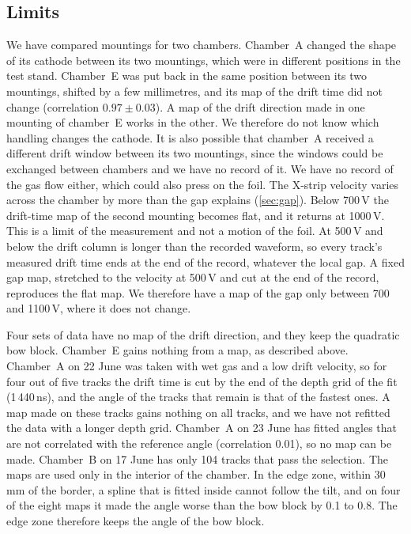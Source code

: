 \subsection{Limits}
We have compared mountings for two chambers. Chamber~A changed the shape of its cathode between its two
mountings, which were in different positions in the test stand. Chamber~E was put back in the same position between
its two mountings, shifted by a few millimetres, and its map of the drift time did not change (correlation
$0.97\pm0.03$). A map of the drift direction made in one mounting of chamber~E works in the other. We therefore do
not know which handling changes the cathode. It is also possible that chamber~A received a different drift window
between its two mountings, since the windows could be exchanged between chambers and we have no record of it. We have
no record of the gas flow either, which could also press on the foil. The X-strip velocity varies across the chamber by
more than the gap explains (\cref{sec:gap}). Below 700\,V the drift-time map of the second mounting becomes flat, and it
returns at 1000\,V. This is a limit of the measurement and not a motion of the foil. At 500\,V and below the drift
column is longer than the recorded waveform, so every track's measured drift time ends at the end of the record,
whatever the local gap. A fixed gap map, stretched to the velocity at 500\,V and cut at the end of the record,
reproduces the flat map. We therefore have a map of the gap only between 700 and 1100\,V, where it does not change.

Four sets of data have no map of the drift direction, and they keep the quadratic bow block. Chamber~E gains nothing
from a map, as described above. Chamber~A on 22 June was taken with wet gas and a low drift velocity, so for four out of
five tracks the drift time is cut by the end of the depth grid of the fit (1\,440\,ns), and the angle of the tracks that
remain is that of the fastest ones. A map made on these tracks gains nothing on all tracks, and we have not refitted
the data with a longer depth grid. Chamber~A on 23 June has fitted angles that are not correlated with the reference
angle (correlation 0.01), so no map can be made. Chamber~B on 17 June has only 104 tracks that pass the selection. The
maps are used only in the interior of the chamber. In the edge zone, within 30\,mm of the border, a spline that is fitted
inside cannot follow the tilt, and on four of the eight maps it made the angle worse than the bow block by 0.1 to
0.8\textdegree. The edge zone therefore keeps the angle of the bow block.
